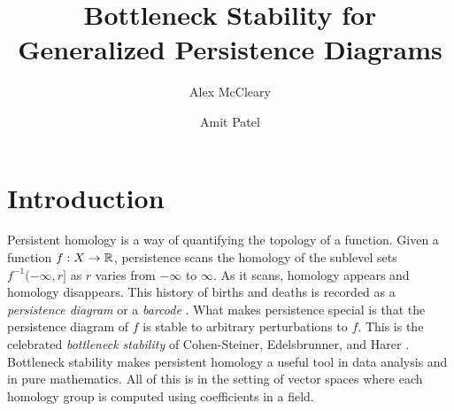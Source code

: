 \documentclass[12pt]{article}
\begin{document}
\theoremstyle{amit}
\newtheorem{defn}{Definition}[section]
\newtheorem{prop}[defn]{Proposition}
\newtheorem{lem}[defn]{Lemma}
\newtheorem{thm}[defn]{Theorem}
\newtheorem{cor}[defn]{Corollary}
\newtheorem{rmk}[defn]{Remark}
\newtheorem{ex}[defn]{Example}

\newcommand\blfootnote[1]{%
  \begingroup
  \renewcommand\thefootnote{}\footnote{#1}%
  \addtocounter{footnote}{-1}%
  \endgroup
}


\title{Bottleneck Stability for Generalized Persistence Diagrams}
\author[1]{Alex McCleary}
\author[1]{Amit Patel}
\date{}

\maketitle


\section{Introduction}



Persistent homology is a way of quantifying the topology of a function.
Given a function $f : X \to {\mathbb R}$, persistence scans the homology of the sublevel
sets $f^{-1}(-\infty, r]$ as $r$ varies from $-\infty$ to $\infty$.
As it scans, homology appears and homology disappears.
This history of births and deaths is recorded as a \emph{persistence diagram} \cite{CSEdH}
or a \emph{barcode} \cite{ZC2005}.
What makes persistence special is that the persistence diagram of $f$ is stable
to arbitrary perturbations to $f$.
This is the celebrated \emph{bottleneck stability} of Cohen-Steiner, Edelsbrunner, and Harer \cite{CSEdH}.
Bottleneck stability makes persistent homology a useful tool in data analysis and in pure mathematics.
All of this is in the setting of vector spaces where each homology group is computed using coefficients in a field.
\end{document}
